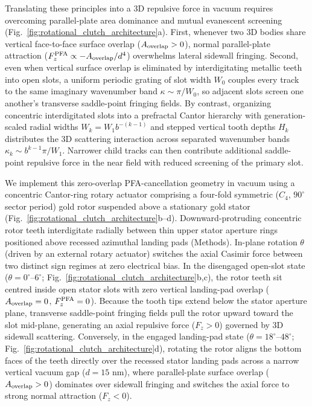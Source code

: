 \documentclass[pdflatex,sn-nature]{sn-jnl}
\begin{document}
Translating these principles into a 3D repulsive force in vacuum requires overcoming parallel-plate area dominance and mutual evanescent screening (Fig.~\ref{fig:rotational_clutch_architecture}a). First, whenever two 3D bodies share vertical face-to-face surface overlap ($A_{\rm overlap} > 0$), normal parallel-plate attraction ($F_z^{\rm PFA} \propto -A_{\rm overlap}/d^4$) overwhelms lateral sidewall fringing. Second, even when vertical surface overlap is eliminated by interdigitating metallic teeth into open slots\cite{levin2010}, a uniform periodic grating of slot width $W_0$ couples every track to the same imaginary wavenumber band $\kappa \sim \pi/W_0$, so adjacent slots screen one another's transverse saddle-point fringing fields. By contrast, organizing concentric interdigitated slots into a prefractal Cantor hierarchy with generation-scaled radial widths $W_k = W_1 b^{-(k-1)}$ and stepped vertical tooth depths $H_k$ distributes the 3D scattering interaction across separated wavenumber bands $\kappa_k \sim b^{k-1}\pi/W_1$. Narrower child tracks can then contribute additional saddle-point repulsive force in the near field with reduced screening of the primary slot.

We implement this zero-overlap PFA-cancellation geometry in vacuum using a concentric Cantor-ring rotary actuator comprising a four-fold symmetric ($C_4$, $90^\circ$ sector period) gold rotor suspended above a stationary gold stator (Fig.~\ref{fig:rotational_clutch_architecture}b--d). Downward-protruding concentric rotor teeth interdigitate radially between thin upper stator aperture rings positioned above recessed azimuthal landing pads (Methods). In-plane rotation $\theta$ (driven by an external rotary actuator) switches the axial Casimir force between two distinct sign regimes at zero electrical bias. In the disengaged open-slot state ($\theta = 0^\circ\text{--}6^\circ$; Fig.~\ref{fig:rotational_clutch_architecture}b,c), the rotor teeth sit centred inside open stator slots with zero vertical landing-pad overlap ($A_{\rm overlap} = 0$, $F_z^{\rm PFA} = 0$). Because the tooth tips extend below the stator aperture plane, transverse saddle-point fringing fields pull the rotor upward toward the slot mid-plane, generating an axial repulsive force ($F_z > 0$) governed by 3D sidewall scattering. Conversely, in the engaged landing-pad state ($\theta = 18^\circ\text{--}48^\circ$; Fig.~\ref{fig:rotational_clutch_architecture}d), rotating the rotor aligns the bottom faces of the teeth directly over the recessed stator landing pads across a narrow vertical vacuum gap ($d = 15\text{ nm}$), where parallel-plate surface overlap ($A_{\rm overlap} > 0$) dominates over sidewall fringing and switches the axial force to strong normal attraction ($F_z < 0$).
\end{document}
